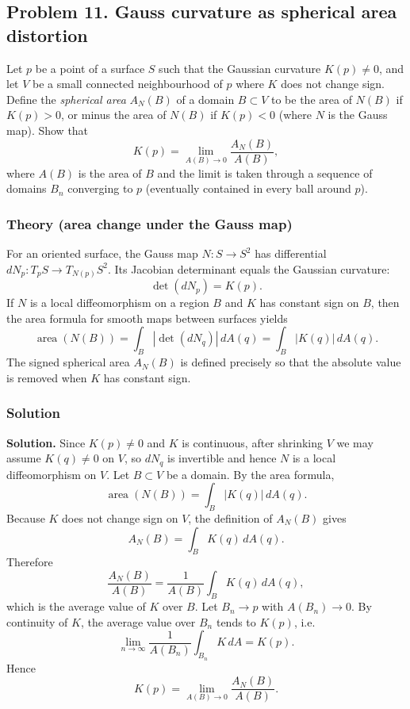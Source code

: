 \documentclass[12pt,a4paper]{article}
\theoremstyle{plain}
\theoremstyle{definition}      %
\begin{document}
	

		
	\subsection*{Problem 11. Gauss curvature as spherical area distortion}
	Let $p$ be a point of a surface $S$ such that the Gaussian curvature $K(p)\neq 0$, and let $V$
	be a small connected neighbourhood of $p$ where $K$ does not change sign.
	Define the \emph{spherical area} $A_N(B)$ of a domain $B\subset V$ to be the area of $N(B)$ if
	$K(p)>0$, or minus the area of $N(B)$ if $K(p)<0$ (where $N$ is the Gauss map).
	Show that
	\[
	K(p)=\lim_{A(B)\to 0}\frac{A_N(B)}{A(B)},
	\]
	where $A(B)$ is the area of $B$ and the limit is taken through a sequence of domains $B_n$
	converging to $p$ (eventually contained in every ball around $p$).
	
	\subsubsection*{Theory (area change under the Gauss map)}
	For an oriented surface, the Gauss map $N:S\to S^2$ has differential $dN_p:T_pS\to T_{N(p)}S^2$.
	Its Jacobian determinant equals the Gaussian curvature:
	\[
	\det(dN_p)=K(p).
	\]
	If $N$ is a local diffeomorphism on a region $B$ and $K$ has constant sign on $B$, then the area
	formula for smooth maps between surfaces yields
	\[
	\operatorname{area}(N(B))=\int_B |\det(dN_q)|\,dA(q)=\int_B |K(q)|\,dA(q).
	\]
	The signed spherical area $A_N(B)$ is defined precisely so that the absolute value is removed when
	$K$ has constant sign.
	
	\subsubsection*{Solution}
	\textbf{Solution.}
	Since $K(p)\neq 0$ and $K$ is continuous, after shrinking $V$ we may assume $K(q)\neq 0$ on $V$,
	so $dN_q$ is invertible and hence $N$ is a local diffeomorphism on $V$.
	Let $B\subset V$ be a domain. By the area formula,
	\[
	\operatorname{area}(N(B))=\int_B |K(q)|\,dA(q).
	\]
	Because $K$ does not change sign on $V$, the definition of $A_N(B)$ gives
	\[
	A_N(B)=\int_B K(q)\,dA(q).
	\]
	Therefore
	\[
	\frac{A_N(B)}{A(B)}=\frac{1}{A(B)}\int_B K(q)\,dA(q),
	\]
	which is the average value of $K$ over $B$.
	Let $B_n\to p$ with $A(B_n)\to 0$. By continuity of $K$, the average value over $B_n$ tends to
	$K(p)$, i.e.
	\[
	\lim_{n\to\infty}\frac{1}{A(B_n)}\int_{B_n}K\,dA = K(p).
	\]
	Hence
	\[
	K(p)=\lim_{A(B)\to 0}\frac{A_N(B)}{A(B)}.
	\]
	
\end{document}
